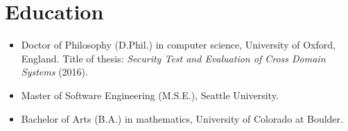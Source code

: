 \section*{Education}
\vspace{-2mm}

\begin{itemize}
    \item Doctor of Philosophy (D.Phil.) in computer science, University of Oxford,
        England. Title of thesis: \emph{Security Test and Evaluation of Cross Domain Systems}
        (2016).\vspace{-1mm}
	\item Master of Software Engineering (M.S.E.), Seattle University.\vspace{-1mm}
	\item Bachelor of Arts (B.A.) in mathematics, University of Colorado at Boulder.
\end{itemize}

